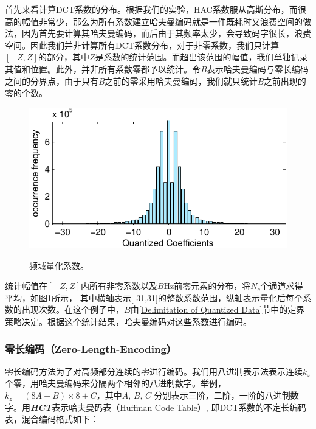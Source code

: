 首先来看计算DCT系数的分布。根据我们的实验，HAC系数服从高斯分布，而很高的幅值非常少，那么为所有系数建立哈夫曼编码就是一件既耗时又浪费空间的做法，因为首先要计算其哈夫曼编码，而后由于其频率太少，会导致码字很长，浪费空间。因此我们并非计算所有DCT系数分布，对于非零系数，我们只计算$[-Z,Z]$的部分，其中$Z$是系数的统计范围。而超出该范围的幅值，我们单独记录其值和位置。此外，并非所有系数零都予以统计。令\emph{B}表示哈夫曼编码与零长编码之间的分界点，由于只有\emph{B}之前的零采用哈夫曼编码，我们就只统计\emph{B}之前出现的零的个数。




\begin{figure}
  \centering
  \includegraphics{Pictures/Compression/f5-crop.pdf}\\
  \caption{频域量化系数。}\label{fig:Quantized Coefficient Distribution}
\end{figure}


统计幅值在$[-Z,Z]$内所有非零系数以及$B$Hz前零元素的分布，将$N_c$个通道求得平均，如图\ref{fig:Quantized Coefficient Distribution}所示， 其中横轴表示[-31,31]的整数系数范围，纵轴表示量化后每个系数的出现次数。在这个例子中，$B$由\ref{Delimitation of Quantized Data}节中的定界策略决定。根据这个统计结果，哈夫曼编码对这些系数进行编码。



\subsubsection{零长编码（Zero-Length-Encoding）}
\label{Zero-Length-Encoding}

零长编码方法为了对高频部分连续的零进行编码。我们用八进制表示法表示连续$k_z$个零，用哈夫曼编码来分隔两个相邻的八进制数字。举例，$k_z=(8A+B)\times 8+C$，其中$A$, $B$, $C$ 分别表示三阶，二阶，一阶的八进制数字。用\textbf{\emph{HCT}}表示哈夫曼码表（Huffman Code Table）, 即DCT系数的不定长编码表，混合编码格式如下：

